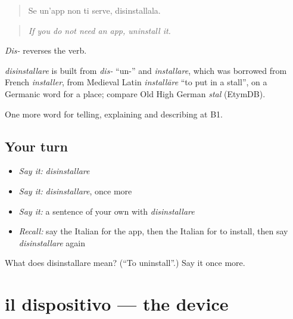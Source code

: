 \begin{quote}
Se un'app non ti serve, disinstallala.
\end{quote}

\begin{quote}
\emph{If you do not need an app, uninstall it.}
\end{quote}

\emph{Dis-} reverses the verb.

\begin{cousinweb}
\emph{disinstallare} is built from \emph{dis-} \textquotedblleft{}un-\textquotedblright{} and \emph{installare}, which was borrowed from French \emph{installer}, from Medieval Latin \emph{installāre} \textquotedblleft{}to put in a stall\textquotedblright{}, on a Germanic word for a place; compare Old High German \emph{stal} (EtymDB).
\end{cousinweb}

\begin{grammarlens}[title={What you've built}]
One more word for telling, explaining and describing at B1.
\end{grammarlens}

\subsection*{Your turn}
\begin{itemize}
\raggedright
  \item \emph{Say it:} \emph{disinstallare}
  \item \emph{Say it:} \emph{disinstallare}, once more
  \item \emph{Say it:} a sentence of your own with \emph{disinstallare}
  \item \emph{Recall:} say the Italian for the app, then the Italian for to install, then say \emph{disinstallare} again
\end{itemize}

\begin{tcolorbox}[breakable,colback=teal!4,colframe=teal!35!black,title={Before you move on}]
What does disinstallare mean? (\textquotedblleft{}To uninstall\textquotedblright{}.) Say it once more.
\end{tcolorbox}
\section[il dispositivo]{il dispositivo — the device}

\label{lesson:IT-C400-dispositivo}



